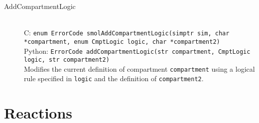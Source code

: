 \documentclass {book}
\newcommand {\ttt} {\texttt}
\begin{document}
\begin{description}
\item[AddCompartmentLogic]
\hfill \\
C: \ttt{enum ErrorCode smolAddCompartmentLogic(simptr sim, char *compartment, enum CmptLogic logic, char *compartment2)}\\
Python: \ttt{ErrorCode addCompartmentLogic(str compartment, CmptLogic logic, str compartment2)}\\
Modifies the current definition of compartment \ttt{compartment} using a logical rule specified in \ttt{logic} and the definition of \ttt{compartment2}.

\end{description}

\section{Reactions}
\end{document}
